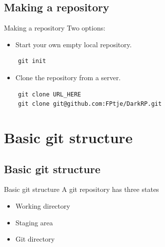 \documentclass[10pt,a4paper]{beamer}
\begin{document}
\subsection{Making a repository}
\begin{frame}[fragile]{Making a repository}
Two options:

\begin{itemize}
\item Start your own empty local repository.
\end{itemize}

	\begin{verbatim}
	git init
	\end{verbatim}

\begin{itemize}
\item Clone the repository from a server.
\end{itemize}

	\begin{verbatim}
	git clone URL_HERE
	git clone git@github.com:FPtje/DarkRP.git
	\end{verbatim}
\end{frame}


\section{Basic git structure}
\subsection{Basic git structure}
\begin{frame}{Basic git structure}
A git repository has three states
\begin{itemize}
\item Working directory
\item Staging area
\item Git directory
\end{itemize}
\end{frame}
\end{document}
